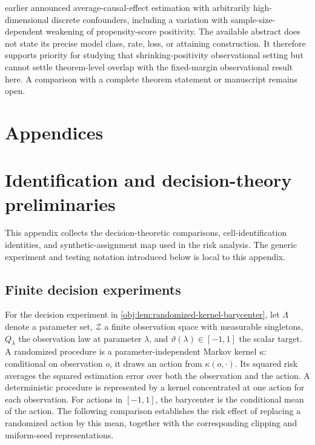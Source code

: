 \documentclass[11pt]{article}
\begin{document}
\citet[abstract 300411]{Kennedy2019DiscreteAbstract} earlier announced average-causal-effect estimation with arbitrarily high-dimensional discrete confounders, including a variation with sample-size-dependent weakening of propensity-score positivity. The available abstract does not state its precise model class, rate, loss, or attaining construction. It therefore supports priority for studying that shrinking-positivity observational setting but cannot settle theorem-level overlap with the fixed-margin observational result here. A comparison with a complete theorem statement or manuscript remains open.


\appendix

\section*{Appendices}

\section{Identification and decision-theory preliminaries}

This appendix collects the decision-theoretic comparisons, cell-identification identities, and synthetic-assignment map used in the risk analysis. The generic experiment and testing notation introduced below is local to this appendix.

\subsection{Finite decision experiments}

For the decision experiment in \cref{obj:lem:randomized-kernel-barycenter}, let \(\Lambda\) denote a parameter set, \(\mathcal Z\) a finite observation space with measurable singletons, \(Q_\lambda\) the observation law at parameter \(\lambda\), and \(\vartheta(\lambda)\in[-1,1]\) the scalar target. A randomized procedure is a parameter-independent Markov kernel \(\kappa\): conditional on observation \(o\), it draws an action from \(\kappa(o,\cdot)\). Its squared risk averages the squared estimation error over both the observation and the action. A deterministic procedure is represented by a kernel concentrated at one action for each observation. For actions in \([-1,1]\), the barycenter is the conditional mean of the action. The following comparison establishes the risk effect of replacing a randomized action by this mean, together with the corresponding clipping and uniform-seed representations.
\end{document}
